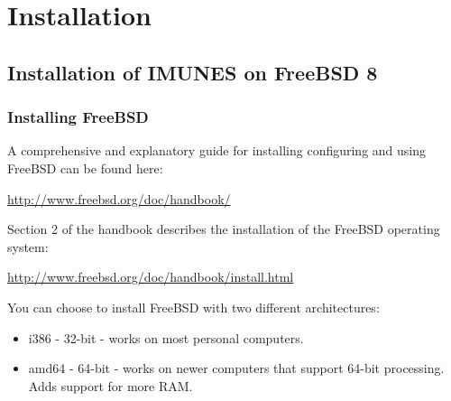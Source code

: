 \chapter{Installation}

\section{Installation of IMUNES on FreeBSD 8}

\subsection{Installing FreeBSD}
A comprehensive and explanatory guide for installing configuring and using
FreeBSD can be found here:

\begin{center}
\url{http://www.freebsd.org/doc/handbook/}
\end{center}

Section 2 of the handbook describes the installation of the FreeBSD operating
system: 
\begin{center}
\url{http://www.freebsd.org/doc/handbook/install.html}
\end{center}

You can choose to install FreeBSD with two different architectures:
\begin{itemize}
\item i386 - 32-bit - works on most personal computers.
\item amd64 - 64-bit - works on newer computers that support 64-bit processing.
Adds support for more RAM.
\end{itemize}

